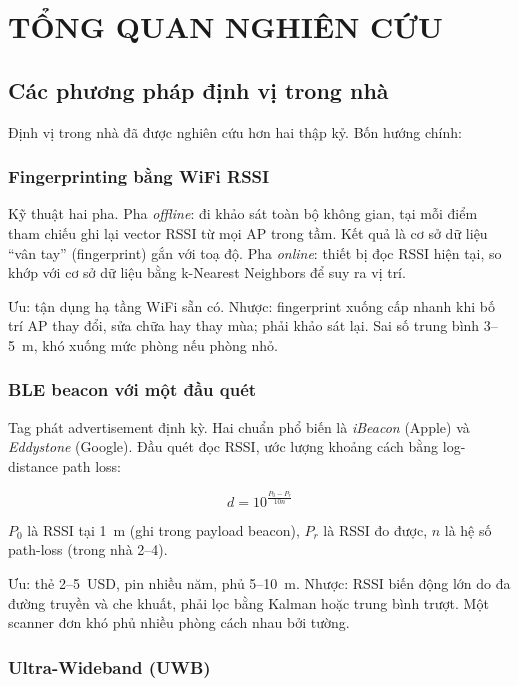 \chapter{TỔNG QUAN NGHIÊN CỨU}
\label{Chapter2}

\section{Các phương pháp định vị trong nhà}

Định vị trong nhà đã được nghiên cứu hơn hai thập kỷ. Bốn hướng chính:

\subsection{Fingerprinting bằng WiFi RSSI}

Kỹ thuật hai pha. Pha \textit{offline}: đi khảo sát toàn bộ không gian, tại mỗi điểm tham chiếu ghi lại vector RSSI từ mọi AP trong tầm. Kết quả là cơ sở dữ liệu ``vân tay'' (fingerprint) gắn với toạ độ. Pha \textit{online}: thiết bị đọc RSSI hiện tại, so khớp với cơ sở dữ liệu bằng k-Nearest Neighbors để suy ra vị trí.

Ưu: tận dụng hạ tầng WiFi sẵn có. Nhược: fingerprint xuống cấp nhanh khi bố trí AP thay đổi, sửa chữa hay thay mùa; phải khảo sát lại. Sai số trung bình 3--5~m, khó xuống mức phòng nếu phòng nhỏ.

\subsection{BLE beacon với một đầu quét}

Tag phát advertisement định kỳ. Hai chuẩn phổ biến là \textit{iBeacon} (Apple) và \textit{Eddystone} (Google). Đầu quét đọc RSSI, ước lượng khoảng cách bằng log-distance path loss:

\begin{equation}
    d = 10^{\frac{P_0 - P_r}{10 n}}
\end{equation}

$P_0$ là RSSI tại 1~m (ghi trong payload beacon), $P_r$ là RSSI đo được, $n$ là hệ số path-loss (trong nhà 2--4).

Ưu: thẻ 2--5~USD, pin nhiều năm, phủ 5--10~m. Nhược: RSSI biến động lớn do đa đường truyền và che khuất, phải lọc bằng Kalman hoặc trung bình trượt. Một scanner đơn khó phủ nhiều phòng cách nhau bởi tường.

\subsection{Ultra-Wideband (UWB)}

